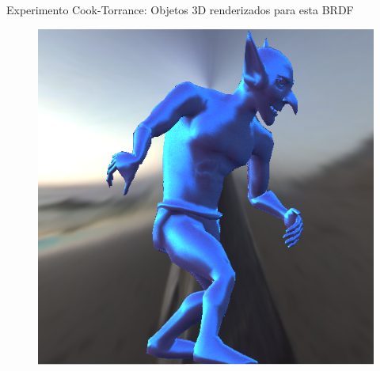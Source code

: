 \begin{frame}{Experimento Cook-Torrance: Objetos 3D renderizados para esta BRDF}
\begin{figure}[H]
\endminipage\hfill
{}%
  \includegraphics[width=\linewidth]{./Imagens/brdfs/cook-torrance-goblin.png}
\endminipage
\end{figure}
\end{frame}

